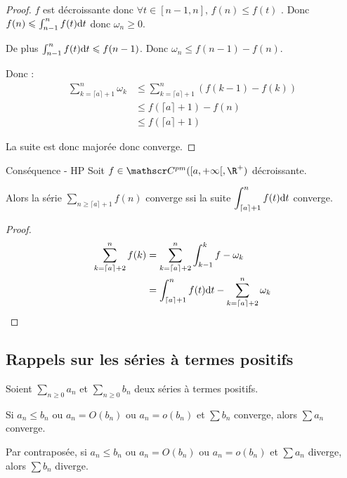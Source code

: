 \begin{proof}
    $f$ est décroissante donc $\forall t \in [n - 1, n], \, f(n) \leqslant f(t)$ .
    Donc $f(n) \leqslant \int_{n - 1}^{n} f(t) \text d t$ donc $\omega_n \geqslant 0$.

    De plus $\int_{n - 1 }^{n } f(t) \text d t \leqslant f(n - 1)$. Donc $\omega_n \leqslant f(n - 1 ) - f(n)$.

    Donc :
    \begin{align*}
        \sum_{k = \lceil a \rceil + 1}^{n} \omega_k & \leqslant \sum_{k = \lceil a \rceil + 1}^{n } (f(k - 1) - f(k)) \\
                                                        & \leqslant f(\lceil a \rceil + 1) - f(n) \\
                                                        & \leqslant f(\lceil a \rceil + 1)
    \end{align*}

    La suite est donc majorée donc converge. 
\end{proof}

\begin{proposition}{Conséquence - HP}{}
    Soit $f \in \mathscr C^{pm}([a, + \infty[, \R^+)$ décroissante. 

    Alors la série $\displaystyle \sum_{n \geqslant \lceil a \rceil + 1} f(n)$ converge ssi la suite 
    $\displaystyle \int_{\lceil a \rceil + 1 }^{n } f(t) \text d t$ converge.
\end{proposition}

\begin{proof}
    \begin{align*}
        \sum_{k = \lceil a \rceil + 2}^{n} f(k) & = \sum_{k = \lceil a \rceil + 2}^{n} \int_{k - 1 }^{k} f- \omega_k \\
                                                & = \int_{\lceil a \rceil + 1}^{n} f(t) \text d t - \sum_{k = \lceil a \rceil + 2}^{n} \omega_k                                 
    \end{align*}
\end{proof}

\subsection{Rappels sur les séries à termes positifs}

\begin{theoreme}{}{}
    Soient $\sum_{n \geqslant 0 } a_n$ et $\sum_{n \geqslant 0} b_n$ deux séries à termes positifs.

    \vspace{0.2mm}
    Si $a_n \leqslant b_n$ ou $a_n = O(b_n)$ ou $a_n = o(b_n)$
    et $\sum b_n$ converge, alors $\sum a_n$ converge.

    \svspace Par contraposée, si 
    $a_n \leqslant b_n$ ou
    $a_n = O(b_n)$ ou
    $a_n = o(b_n)$ 
    et $\sum a_n$ diverge, alors $\sum b_n$ diverge. 
\end{theoreme}

